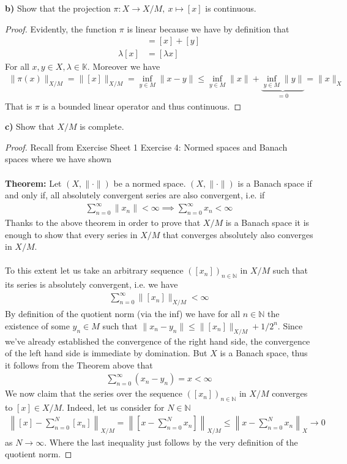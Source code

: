 \documentclass[12pt,a4paper]{article}
\theoremstyle{definition}
\begin{document}
\newpage
\noindent \textbf{b)} Show that the projection $\pi : X \to X/M, \ x \mapsto [x]$ is continuous. 
\begin{proof}
Evidently, the function $\pi$ is linear because we have by definition that
\begin{align*}
[x+y]&=[x]+[y] \\
\lambda [x] &= [\lambda x]  
\end{align*}
For all $x,y \in X, \lambda \in \mathbb{K}$. Moreover we have 
\begin{align*}
\| \pi(x) \|_{X/M} = \| [x] \|_{X/M} = \inf_{y \in M} \| x-y\| \leq \inf_{y \in M} \| x\| + \underbrace{\inf_{y \in M} \| y \|}_{=0} = \|x\|_X 
\end{align*}
That is $\pi$ is a bounded linear operator and thus continuous. 
\end{proof}
\noindent \textbf{c)} Show that $X/M$ is complete.
\begin{proof}
Recall from Exercise Sheet 1 Exercise 4: Normed spaces and Banach spaces where we have shown
\\\\
\textbf{Theorem:} Let $(X, \| \cdot \|)$ be a normed space. $(X, \| \cdot \|)$ is a Banach space if and only if, all absolutely convergent series are also convergent, i.e. if 
\begin{align*}
\sum_{n=0}^\infty \|x_n\| < \infty \implies \sum_{n=0}^\infty x_n < \infty 
\end{align*}
Thanks to the above theorem in order to prove that $X/M$ is a Banach space it is enough to show that every series in $X/M$ that converges absolutely also converges in $X/M$. 
\\\\
To this extent let us take an arbitrary sequence $([x_n])_{n \in \mathbb{N}}$ in $X/M$ such that its series is absolutely convergent, i.e. we have 
\begin{align*}
\sum_{n=0}^\infty \|[x_n]\|_{X/M} < \infty 
\end{align*}
By definition of the quotient norm (via the inf) we have for all $n \in \mathbb{N}$ the existence of some $y_n \in M$ such that $\|x_n-y_n \| \leq \|[x_n]\|_{X/M} + 1/2^n$. Since we've already established the convergence of the right hand side, the convergence of the left hand side is immediate by domination. But $X$ is a Banach space, thus it follows from the Theorem above that
\begin{align*}
\sum_{n=0}^\infty (x_n-y_n)=x < \infty 
\end{align*}
We now claim that the series over the sequence $([x_n])_{n \in \mathbb{N}}$ in $X/M$ converges to $[x] \in X/M$. 
\newpage
Indeed, let us consider for $N \in \mathbb{N}$ 
\begin{align*}
\left\| [x]- \sum_{n=0}^N [x_n] \right\|_{X/M} = \left\| [x - \sum_{n=0}^N x_n] \right\|_{X/M}  \leq \left\| x- \sum_{n=0}^N x_n \right\|_X \to 0 
\end{align*}
as $N \to \infty$. Where the last inequality just follows by the very definition of the quotient norm. 
\end{proof} 
\end{document}

